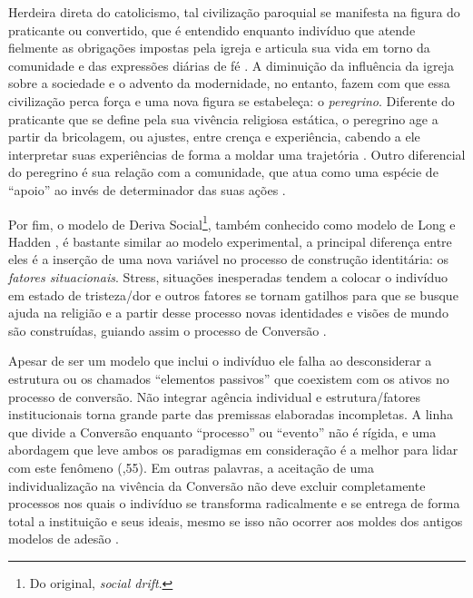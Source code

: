 \documentclass[
	12pt,				%
	oneside,			%
	a4paper,			%
	sumario=tradicional,
	english,			%
	brazil				%
	]{abntex2}
\begin{document}
Herdeira direta do catolicismo, tal civilização paroquial se manifesta na figura do praticante ou convertido, que é entendido enquanto indivíduo que atende fielmente as obrigações impostas pela igreja e articula sua vida em torno da comunidade e das expressões diárias de fé \autocite[84]{hervieu-leger_peregrino_2015}. A diminuição da influência da igreja sobre a sociedade e o advento da modernidade, no entanto, fazem com que essa civilização perca força e uma nova figura se estabeleça: o \emph{peregrino}. Diferente do praticante que se define pela sua vivência religiosa estática, o peregrino age a partir da bricolagem, ou ajustes, entre crença e experiência, cabendo a ele interpretar suas experiências de forma a moldar uma trajetória \autocite[89]{hervieu-leger_peregrino_2015}. Outro diferencial do peregrino é sua relação com a comunidade, que atua como uma espécie de ``apoio'' ao invés de determinador das suas ações \autocite[86]{hervieu-leger_peregrino_2015}.

Por fim, o modelo de Deriva Social\footnote{Do original, \emph{social drift}.}, também conhecido como modelo de Long e Hadden \autocite*{long_religious_1983}, é bastante similar ao modelo experimental, a principal diferença entre eles é a inserção de uma nova variável no processo de construção identitária: os \emph{fatores situacionais}. Stress, situações inesperadas tendem a colocar o indivíduo em estado de tristeza/dor e outros fatores se tornam gatilhos para que se busque ajuda na religião e a partir desse processo novas identidades e visões de mundo são construídas, guiando assim o processo de Conversão \autocite[07]{kilbourne_paradigm_1989}.

Apesar de ser um modelo que inclui o indivíduo ele falha ao desconsiderar a estrutura ou os chamados ``elementos passivos'' que coexistem com os ativos no processo de conversão. Não integrar agência individual e estrutura/fatores institucionais torna grande parte das premissas elaboradas incompletas. A linha que divide a Conversão enquanto ``processo'' ou ``evento'' não é rígida, e uma abordagem que leve ambos os paradigmas em consideração é a melhor para lidar com este fenômeno (\textcite{flinn_conversion_1999},55). Em outras palavras, a aceitação de uma individualização na vivência da Conversão não deve excluir completamente processos nos quais o indivíduo se transforma radicalmente e se entrega de forma total a instituição e seus ideais, mesmo se isso não ocorrer aos moldes dos antigos modelos de adesão \autocite[05]{rosas_conversao_2015}.
\end{document}
